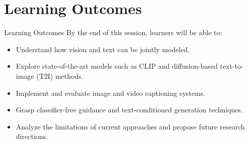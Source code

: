 \section{Learning Outcomes}
\begin{frame}{Learning Outcomes}
    By the end of this session, learners will be able to:
    \begin{itemize}
        \item Understand how vision and text can be jointly modeled.
        \item Explore state-of-the-art models such as CLIP and diffusion-based text-to-image (T2I) methods.
        \item Implement and evaluate image and video captioning systems.
        \item Grasp classifier-free guidance and text-conditioned generation techniques.
        \item Analyze the limitations of current approaches and propose future research directions.
    \end{itemize}
\end{frame}